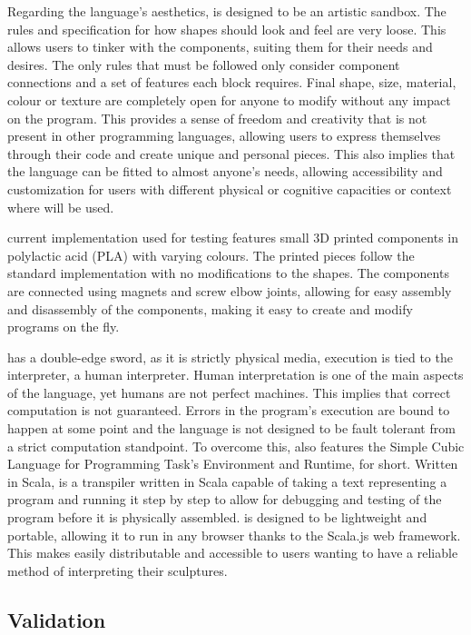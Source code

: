 Regarding the language's aesthetics, \sculpt is designed to be an artistic sandbox. The rules and specification for how shapes should look and feel are very loose. This allows users to tinker with the components, suiting them for their needs and desires.
The only rules that must be followed only consider component connections and a set of features each block requires. Final shape, size, material, colour or texture are completely open for anyone to modify without any impact on the program.
This provides a sense of freedom and creativity that is not present in other programming languages, allowing users to express themselves through their code and create unique and personal pieces.
This also implies that the language can be fitted to almost anyone's needs, allowing accessibility and customization for users with different physical or cognitive capacities or context where \sculpt will be used.

\sculpt current implementation used for testing features small 3D printed components in polylactic acid (PLA) with varying colours.
The printed pieces follow the standard \sculpt implementation with no modifications to the shapes.
The components are connected using magnets and screw elbow joints, allowing for easy assembly and disassembly of the components, making it easy to create and modify programs on the fly.

\sculpt has a double-edge sword, as it is strictly physical media, execution is tied to the interpreter, a human interpreter.
Human interpretation is one of the main aspects of the language, yet humans are not perfect machines. This implies that correct computation is not guaranteed.
Errors in the program's execution are bound to happen at some point and the language is not designed to be fault tolerant from a strict computation standpoint.
To overcome this, \sculpt also features the Simple Cubic Language for Programming Task's Environment and Runtime, \sculpter for short.
Written in Scala, \sculpter is a transpiler written in Scala capable of taking a text representing a \sculpt program and running it step by step to allow for debugging and testing of the program before it is physically assembled.
\sculpter is designed to be lightweight and portable, allowing it to run in any browser thanks to the Scala.js web framework. This makes easily distributable and accessible to users wanting to have a reliable method of interpreting their sculptures.

\subsection{Validation}
\label{sec:methodology:validation}

